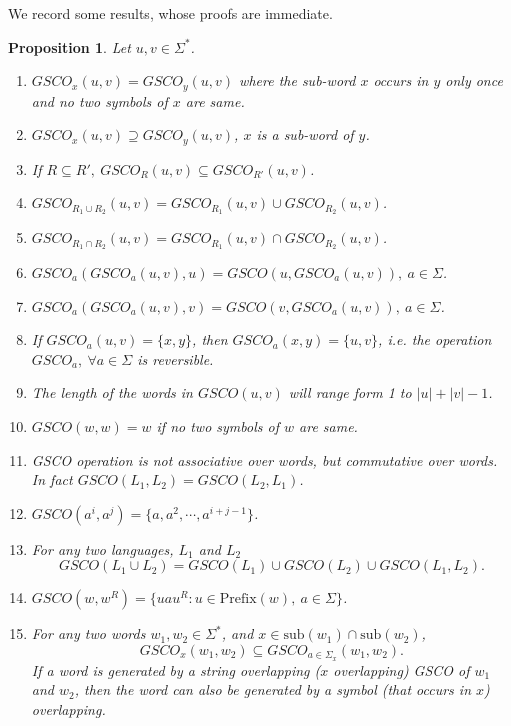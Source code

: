 \documentclass{llncs}
\newtheorem{prop}{Proposition}
\newcommand{\sg}{\Sigma}
\newcommand{\p}{\mathrm{Prefix}}
\newcommand{\sub}{\mathrm{sub}}
\begin{document}
\par We record some results, whose proofs are immediate.
\begin{prop}
Let $u,v\in\sg^*$.
\begin{enumerate}
\item $GSCO_x(u,v)=GSCO_y(u,v)$ where the sub-word $x$ occurs in $y$ only once
and no two  symbols of  $x$ are same.
\item $GSCO_x(u,v)\supseteq GSCO_y(u,v)$, $x$ is a sub-word of $y$.
\item If $R\subseteq R',~GSCO_R(u,v)\subseteq GSCO_{R'}(u,v)$.
\item $GSCO_{R_1\cup R_2}(u,v)=GSCO_{R_1}(u,v)\cup GSCO_{R_2}(u,v)$.
\item $GSCO_{R_1\cap R_2}(u,v)=GSCO_{R_1}(u,v)\cap GSCO_{R_2}(u,v)$.
\item $GSCO_a(GSCO_a(u,v),u)=GSCO(u,GSCO_a(u,v)),~a\in\sg$.
\item $GSCO_a(GSCO_a(u,v),v)=GSCO(v,GSCO_a(u,v)),~a\in\sg$.
\item If $GSCO_a(u,v)=\{x,y\}$, then $GSCO_a(x,y)=\{u,v\}$, i.e.
the operation $GSCO_a,~\forall a \in\sg$ is reversible.
\item The length of the words in $GSCO(u,v)$ will range form 1 to $|u|+|v|-1$.
\item $GSCO(w,w)=w$ if no two  symbols of $w$ are same.
\item GSCO operation is not associative over words, but commutative over words.
In fact
$GSCO(L_1,L_2)=GSCO(L_2,L_1)$.
\item $GSCO(a^i,a^j)=\{a,a^2,\cdots,a^{i+j-1}\}$.
\item For any two languages, $L_1$ and $L_2$
\[GSCO(L_1\cup L_2)=GSCO(L_1)\cup GSCO(L_2)\cup GSCO(L_1,L_2).\]
\item $GSCO(w,w^R)=\{uau^R:u\in\p(w), ~a\in\sg\}$.
\item \label{1}For any two words $w_1,w_2\in\sg^*$, and
$x\in\sub(w_1)\cap\sub(w_2)$,
\[GSCO_x(w_1,w_2)\subseteq GSCO_{a\in\sg_x}(w_1,w_2).\]
If a word is generated by a string overlapping ($x$ overlapping)
  GSCO of $w_1$ and $w_2$, then the word can also be
generated by a symbol (that occurs in $x$) overlapping.
\end{enumerate}
\end{prop}
\end{document}
